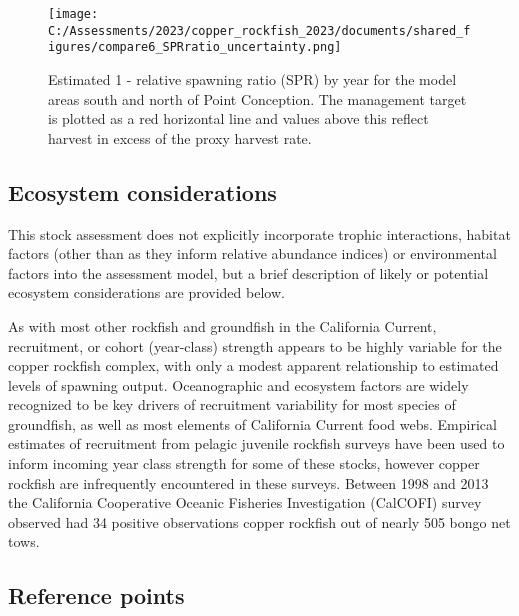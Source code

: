 \documentclass[11pt,
  english,
  letterpaper,
]{article}
\begin{document}




\begin{figure}
\centering
\texttt{[image: C:/Assessments/2023/copper\_rockfish\_2023/documents/shared\_figures/compare6\_SPRratio\_uncertainty.png]}
\caption{Estimated 1 - relative spawning ratio (SPR) by year for the model areas south and north of Point Conception. The management target is plotted as a red horizontal line and values above this reflect harvest in excess of the proxy harvest rate.\label{fig:es-1-spr}}
\end{figure}

\pagebreak

\hypertarget{ecosystem-considerations}{%
\subsection*{Ecosystem considerations}\label{ecosystem-considerations}}

This stock assessment does not explicitly incorporate trophic interactions, habitat factors (other than as they inform relative abundance indices) or environmental factors into the assessment model, but a brief description of likely or potential ecosystem considerations are provided below.

As with most other rockfish and groundfish in the California Current, recruitment, or cohort (year-class) strength appears to be highly variable for the copper rockfish complex, with only a modest apparent relationship to estimated levels of spawning output. Oceanographic and ecosystem factors are widely recognized to be key drivers of recruitment variability for most species of groundfish, as well as most elements of California Current food webs. Empirical estimates of recruitment from pelagic juvenile rockfish surveys have been used to inform incoming year class strength for some of these stocks, however copper rockfish are infrequently encountered in these surveys. Between 1998 and 2013 the California Cooperative Oceanic Fisheries Investigation (CalCOFI) survey observed had 34 positive observations copper rockfish out of nearly 505 bongo net tows.

\hypertarget{reference-points}{%
\subsection*{Reference points}\label{reference-points}}
\end{document}
